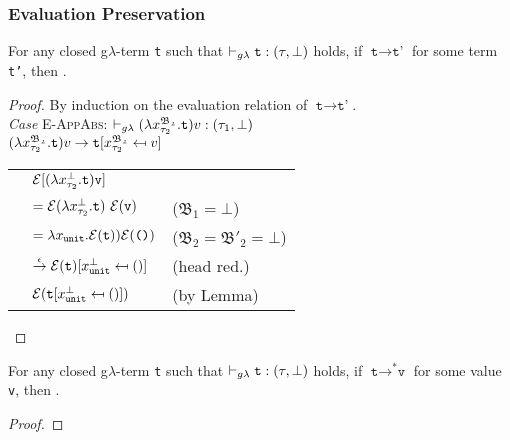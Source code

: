 \subsubsection{Evaluation Preservation}
\begin{theorem}
	For any closed g$\lambda$-term \texttt{t} such that
	$\vdash_{g\lambda} \texttt{t} : (\tau, \bot)$ holds, 
	if	$\texttt{t} \rightarrow \texttt{t'}$ for some term \texttt{t'}, then
	 . 
\end{theorem}
\begin{proof} By induction on the evaluation relation of $\texttt{t} \rightarrow \texttt{t'}$. \\

\noindent\textit{Case} \textsc{E-AppAbs}: \qquad 
 $\vdash_{g\lambda} (\lambda x^{\mathfrak{B_{2}}}_{\tau_{2}}.\texttt{t})v : (\tau_{1}, \bot) $ \\
$(\lambda x^{\mathfrak{B_{2}}}_{\tau_{2}}.\texttt{t})v 
\rightarrow \texttt{t} [x^{\mathfrak{B_{2}}}_{\tau_{2}} \mapsfrom v]$ \\


\begin{center}
\begin{tabular}{lll}
   & $\mathcal{E}[(\lambda x^{\bot}_{\tau_{2}}.\texttt{t})\texttt{v}]$ &\\
   & $= \mathcal{E}(\lambda x^{\bot}_{\tau_{2}}.\texttt{t}) ~ \mathcal{E}(\texttt{v})$ 
   & ($ \mathfrak{B_{1}} = \bot $)  \\
 	& $ = \lambda x_{\texttt{unit}}. \mathcal{E}(\texttt{t}))\mathcal{E}(\texttt{()})$ 
 	& ($\mathfrak{B_{2}} = \mathfrak{B'_{2}} = \bot $) \\
   &  $ \stackrel{\epsilon}{\rightarrow} 
   \mathcal{E}(\texttt{t}) [x^{\bot}_{\texttt{unit}} \mapsfrom ()]$ & (head red.) \\
   & $ \mathcal{E}(\texttt{t} [x^{\bot}_{\texttt{unit}} \mapsfrom ()]) $ 
   & (by Lemma) 

 \end{tabular}
  \end{center}
\end{proof}

\begin{lemma}
	For any closed g$\lambda$-term \texttt{t} such that
	$\vdash_{g\lambda} \texttt{t} : (\tau, \bot)$ holds, 
	if	$\texttt{t} \rightarrow^{\ast} \texttt{v}$ for some value \texttt{v}, then
	 . 
\end{lemma}
\begin{proof}

\end{proof}
